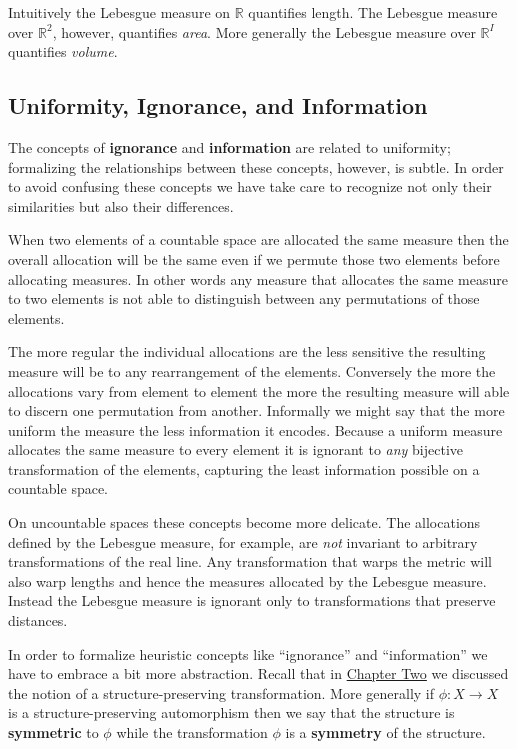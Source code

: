 \documentclass[
  letterpaper,
  DIV=11,
  numbers=noendperiod]{scrartcl}
\begin{document}
Intuitively the Lebesgue measure on \(\mathbb{R}\) quantifies length.
The Lebesgue measure over \(\mathbb{R}^{2}\), however, quantifies
\emph{area}. More generally the Lebesgue measure over \(\mathbb{R}^{I}\)
quantifies \emph{volume}.

\hypertarget{uniformity-ignorance-and-information}{%
\subsection{Uniformity, Ignorance, and
Information}\label{uniformity-ignorance-and-information}}

The concepts of \textbf{ignorance} and \textbf{information} are related
to uniformity; formalizing the relationships between these concepts,
however, is subtle. In order to avoid confusing these concepts we have
take care to recognize not only their similarities but also their
differences.

When two elements of a countable space are allocated the same measure
then the overall allocation will be the same even if we permute those
two elements before allocating measures. In other words any measure that
allocates the same measure to two elements is not able to distinguish
between any permutations of those elements.

The more regular the individual allocations are the less sensitive the
resulting measure will be to any rearrangement of the elements.
Conversely the more the allocations vary from element to element the
more the resulting measure will able to discern one permutation from
another. Informally we might say that the more uniform the measure the
less information it encodes. Because a uniform measure allocates the
same measure to every element it is ignorant to \emph{any} bijective
transformation of the elements, capturing the least information possible
on a countable space.

On uncountable spaces these concepts become more delicate. The
allocations defined by the Lebesgue measure, for example, are \emph{not}
invariant to arbitrary transformations of the real line. Any
transformation that warps the metric will also warp lengths and hence
the measures allocated by the Lebesgue measure. Instead the Lebesgue
measure is ignorant only to transformations that preserve distances.

In order to formalize heuristic concepts like ``ignorance'' and
``information'' we have to embrace a bit more abstraction. Recall that
in
\href{https://betanalpha.github.io/assets/chapters_html/spaces.html}{Chapter
Two} we discussed the notion of a structure-preserving transformation.
More generally if \(\phi : X \rightarrow X\) is a structure-preserving
automorphism then we say that the structure is \textbf{symmetric} to
\(\phi\) while the transformation \(\phi\) is a \textbf{symmetry} of the
structure.
\end{document}
